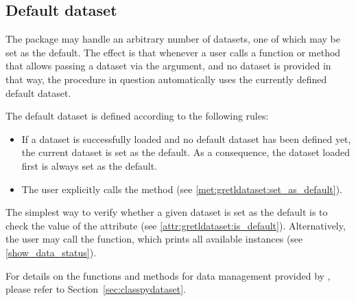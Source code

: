 \subsection{Default dataset}\label{sec:globalandindivodual()}
The \gretlpy package may handle an arbitrary number of datasets,
one of which may be set as the default. The effect is that whenever
a user calls a function or method that allows passing a dataset
via the  argument, and no dataset is provided in
that way, the procedure in question automatically uses the
currently defined default dataset.

The default dataset is defined according to the following rules:
\begin{itemize}
	\item If a dataset is successfully loaded and no default
		dataset has been defined yet, the current dataset is set
		as the default. As a consequence, the dataset loaded first
		is always set as the default.
	\item The user explicitly calls the 
		method (see \ref{met:gretldataset:set_as_default}).
\end{itemize}

The simplest way to verify whether a given dataset is set as the
default is to check the value of the 
attribute (see \ref{attr:gretldataset:is_default}). Alternatively,
the user may call the  function,
which prints all available \classpydataset instances (see
\ref{show_data_status}).

For details on the functions and methods for data management
provided by \gretlpy, please refer to Section~\ref{sec:classpydataset}.
